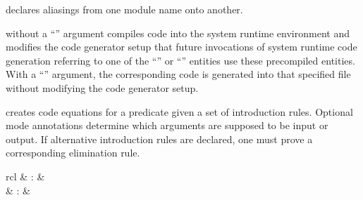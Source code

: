 \begin{isabellebody}
\begin{isamarkuptext}
\begin{description}
  \item \hyperlink{command.HOL.code-modulename}{\mbox{}} declares aliasings from one
  module name onto another.

  \item \hyperlink{command.HOL.code-reflect}{\mbox{}} without a ``''
  argument compiles code into the system runtime environment and
  modifies the code generator setup that future invocations of system
  runtime code generation referring to one of the ``'' or ``'' entities use these precompiled
  entities.  With a ``'' argument, the corresponding code
  is generated into that specified file without modifying the code
  generator setup.

  \item \hyperlink{command.HOL.code-pred}{\mbox{}} creates code equations for a predicate
    given a set of introduction rules. Optional mode annotations determine
    which arguments are supposed to be input or output. If alternative 
    introduction rules are declared, one must prove a corresponding elimination
    rule.

  \end{description}%
\end{isamarkuptext}%
\isamarkuptrue%
%
\isamarkuptrue%
%
\begin{isamarkuptext}%
\begin{matharray}{rcl}
    \hypertarget{command.HOL.specification}{\hyperlink{command.HOL.specification}{\mbox{}}} & : &  \\
    \hypertarget{command.HOL.ax-specification}{\hyperlink{command.HOL.ax-specification}{\mbox{}}} & : &  \\
  \end{matharray}


\end{isamarkuptext}
\end{isabellebody}
